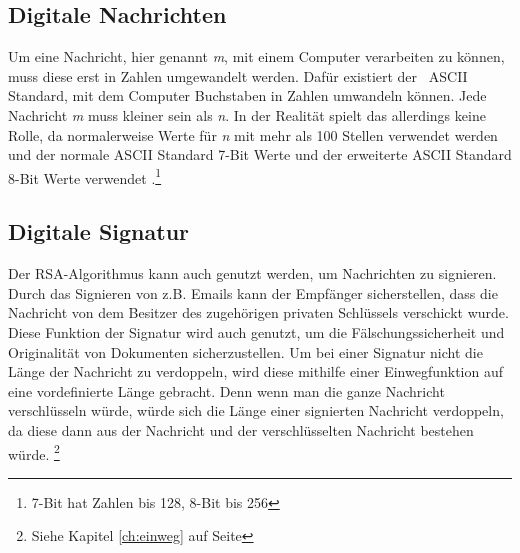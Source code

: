 \documentclass[12pt,a4paper]{scrartcl}
\begin{document}
	\subsection{Digitale Nachrichten}
	\label{chap:digital_text}
Um eine Nachricht, hier genannt \textit{m}, mit einem Computer verarbeiten zu können, muss diese erst in Zahlen umgewandelt werden. Dafür existiert der ~ASCII~ Standard, mit dem Computer Buchstaben in Zahlen umwandeln können. Jede Nachricht \textit{m} muss kleiner sein als \textit{n}. In der Realität spielt das allerdings keine Rolle, da normalerweise Werte für \textit{n} mit mehr als 100 Stellen verwendet werden und der normale ASCII Standard 7-Bit Werte und der erweiterte ASCII Standard 8-Bit Werte verwendet \cite[S.5]{rowland}.\footnote{7-Bit hat Zahlen bis 128, 8-Bit bis 256}
	
	\subsection{Digitale Signatur}
	\label{cha:digital_signature}
	Der RSA-Algorithmus kann auch genutzt werden, um Nachrichten zu signieren. Durch das Signieren von z.B. Emails kann der Empfänger sicherstellen, dass die Nachricht von dem Besitzer des zugehörigen privaten Schlüssels verschickt wurde. Diese Funktion der Signatur wird auch genutzt, um die Fälschungssicherheit und Originalität von  Dokumenten sicherzustellen. Um bei einer Signatur nicht die Länge der Nachricht zu verdoppeln, wird diese mithilfe einer Einwegfunktion auf eine vordefinierte Länge gebracht. Denn wenn man die ganze Nachricht verschlüsseln würde, würde sich die Länge einer signierten Nachricht verdoppeln, da diese dann aus der Nachricht und der verschlüsselten Nachricht bestehen würde. \cite[S.15f]{Beutelspacher2015-jl} \footnote{Siehe Kapitel \ref{ch:einweg} auf Seite \pageref{ch:einweg}}\\
\end{document}
